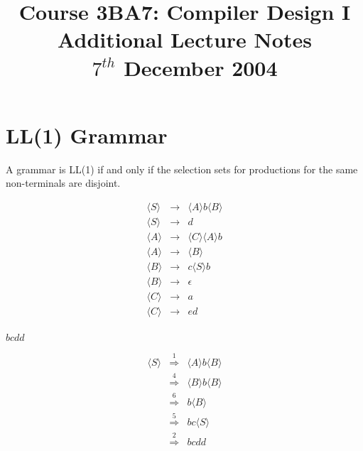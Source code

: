 \documentclass[a4paper,12pt]{article}
\newcommand{\nonterminal}[1]{\langle #1 \rangle}
\begin{document}
\title{Course 3BA7: Compiler Design I \\ Additional Lecture Notes \\ $7^{th}$ December 2004}

\maketitle

\section*{LL(1) Grammar}

A grammar is LL(1) if and only if the selection sets for productions for
the same non-terminals are disjoint.

\begin{eqnarray*}
\nonterminal{S}	&	\to	&	\nonterminal{A} b \nonterminal{B}	\\
\nonterminal{S}	&	\to	&	d 												\\
\nonterminal{A}	&	\to	&	\nonterminal{C} \nonterminal{A}	b	\\
\nonterminal{A}	&	\to	&	\nonterminal{B}							\\
\nonterminal{B}	&	\to	&	c \nonterminal{S} b						\\
\nonterminal{B}	&	\to	&	\epsilon										\\
\nonterminal{C}	&	\to	&	a												\\
\nonterminal{C}	&	\to	&	e d											\\
\end{eqnarray*}

$bcdd$

\begin{eqnarray*}
\nonterminal{S}	&	\stackrel{1}{\Rightarrow}	&	\nonterminal{A} b \nonterminal{B}	\\
						&	\stackrel{4}{\Rightarrow}	&	\nonterminal{B} b \nonterminal{B}	\\
						&	\stackrel{6}{\Rightarrow}	&	b \nonterminal{B}							\\
						&	\stackrel{5}{\Rightarrow}	&	b c \nonterminal{S}						\\
						&	\stackrel{2}{\Rightarrow}	&	b c d d										\\
\end{eqnarray*}

\begin{table}[hbtp]


\end{table}
\end{document}
